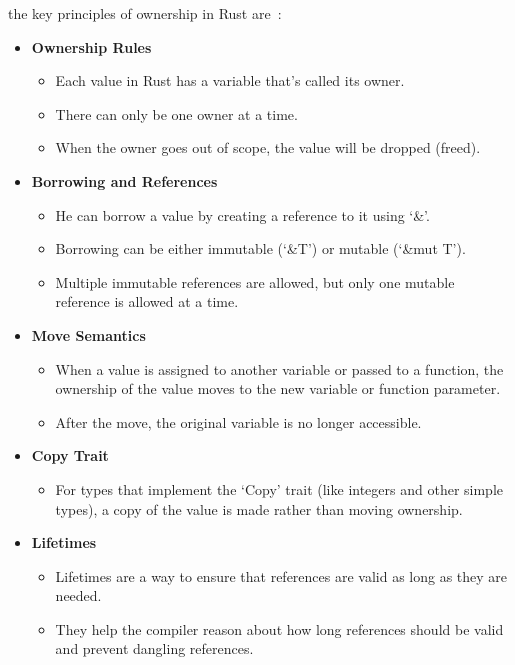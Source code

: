 the key principles of ownership in Rust are~\cite{rust}:
\begin{itemize}
    \item \textbf{Ownership Rules}
    \begin{itemize}
        \item Each value in Rust has a variable that's called its owner.
        \item There can only be one owner at a time.
        \item When the owner goes out of scope, the value will be dropped (freed).
    \end{itemize}
    \item \textbf{Borrowing and References}
    \begin{itemize}
        \item He can borrow a value by creating a reference to it using `\&'.
        \item Borrowing can be either immutable (`\&T') or mutable (`\&mut T').
        \item Multiple immutable references are allowed, but only one mutable reference is allowed at a time.
    \end{itemize}
    \item \textbf{Move Semantics}
    \begin{itemize}
        \item When a value is assigned to another variable or passed to a function, the ownership of the value moves to the new variable or function parameter.
        \item After the move, the original variable is no longer accessible.
    \end{itemize}
    \item \textbf{Copy Trait}
    \begin{itemize}
        \item For types that implement the `Copy' trait (like integers and other simple types), a copy of the value is made rather than moving ownership.
    \end{itemize}
    \item \textbf{Lifetimes}
    \begin{itemize}
        \item Lifetimes are a way to ensure that references are valid as long as they are needed.
        \item They help the compiler reason about how long references should be valid and prevent dangling references.
    \end{itemize}
\end{itemize}


